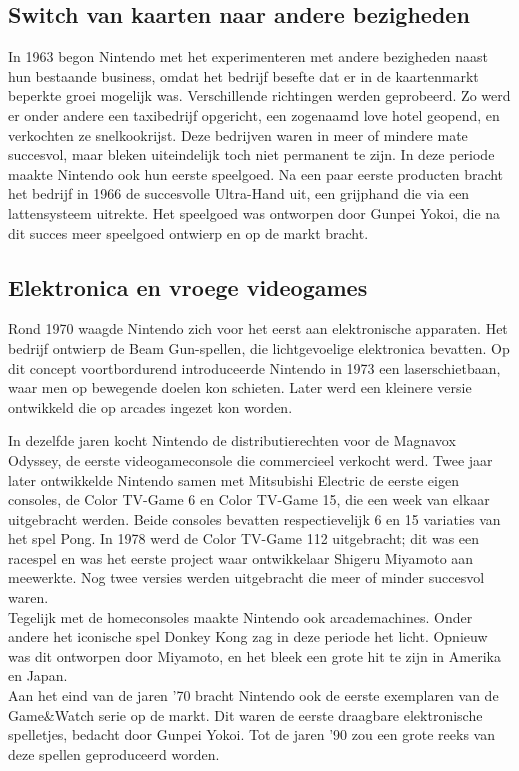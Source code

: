 \documentclass{article}
\begin{document}
\subsection{Switch van kaarten naar andere bezigheden}
In 1963 begon Nintendo met het experimenteren met andere bezigheden naast hun bestaande business, omdat het bedrijf besefte dat er in de kaartenmarkt beperkte groei mogelijk was. Verschillende richtingen werden geprobeerd. Zo werd er onder andere een taxibedrijf opgericht, een zogenaamd love hotel geopend, en verkochten ze snelkookrijst. Deze bedrijven waren in meer of mindere mate succesvol, maar bleken uiteindelijk toch niet permanent te zijn. 
In deze periode maakte Nintendo ook hun eerste speelgoed. Na een paar eerste producten bracht het bedrijf in 1966 de succesvolle Ultra-Hand uit, een grijphand die via een lattensysteem uitrekte. Het speelgoed was ontworpen door Gunpei Yokoi, die na dit succes meer speelgoed ontwierp en op de markt bracht.


\subsection{Elektronica en vroege videogames}
Rond 1970 waagde Nintendo zich voor het eerst aan elektronische apparaten. Het bedrijf ontwierp de Beam Gun-spellen, die lichtgevoelige elektronica bevatten. Op dit concept voortbordurend introduceerde Nintendo in 1973 een laserschietbaan, waar men op bewegende doelen kon schieten. Later werd een kleinere versie ontwikkeld die op arcades ingezet kon worden.

In dezelfde jaren kocht Nintendo de distributierechten voor de Magnavox Odyssey, de eerste videogameconsole die commercieel verkocht werd. Twee jaar later ontwikkelde Nintendo samen met Mitsubishi Electric de eerste eigen consoles, de Color TV-Game 6 en Color TV-Game 15, die een week van elkaar uitgebracht werden. Beide consoles bevatten respectievelijk 6 en 15 variaties van het spel Pong. In 1978 werd de Color TV-Game 112 uitgebracht; dit was een racespel en was het eerste project waar ontwikkelaar Shigeru Miyamoto aan meewerkte. Nog twee versies werden uitgebracht die meer of minder succesvol waren. 
\\ 
Tegelijk met de homeconsoles maakte Nintendo ook arcademachines. Onder andere het iconische spel Donkey Kong zag in deze periode het licht. Opnieuw was dit ontworpen door Miyamoto, en het bleek een grote hit te zijn in Amerika en Japan.
\\ 
Aan het eind van de jaren '70 bracht Nintendo ook de eerste exemplaren van de Game\&Watch serie op de markt. Dit waren de eerste draagbare elektronische spelletjes, bedacht door Gunpei Yokoi. Tot de jaren '90 zou een grote reeks van deze spellen geproduceerd worden.
\end{document}

